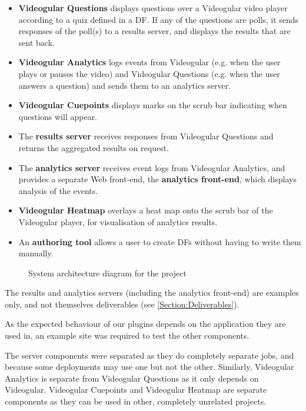 \begin{itemize}
	\item
		\textbf{Videogular Questions} displays questions over a \gls{Videogular} video player according to a quiz defined in a \gls{DF}. If any of the questions are polls, it sends responses of the poll(s) to a results server, and displays the results that are sent back.
	\item
		\textbf{Videogular Analytics} logs events from \gls{Videogular} (e.g. when the user plays or pauses the video) and Videogular Questions (e.g. when the user answers a question) and sends them to an analytics server.
	\item
		\textbf{Videogular Cuepoints} displays marks on the \gls{scrub bar} indicating when questions will appear.
	\item
		The \textbf{results server} receives responses from Videogular Questions and returns the aggregated results on request.
	\item
		The \textbf{analytics server} receives event logs from Videogular Analytics, and provides a separate Web front-end, the \textbf{analytics front-end}, which displays analysis of the events.
	\item
		\textbf{Videogular Heatmap} overlays a heat map onto the \gls{scrub bar} of the \gls{Videogular} player, for visualisation of analytics results.
	\item
		An \textbf{authoring tool} allows a user to create \glspl{DF} without having to write them manually.
\end{itemize}

\begin{figure}[h!]
	\centering
	
	\caption{System architecture diagram for the project \label{fig:System architecture diagram}}
\end{figure}

The results and analytics servers (including the analytics front-end) are examples only, and not themselves deliverables (see \autoref{Section:Deliverables}).

As the expected behaviour of our plugins depends on the application they are used in, an example site was required to test the other components.

The server components were separated as they do completely separate jobs, and because some deployments may use one but not the other. Similarly, Videogular Analytics is separate from Videogular Questions as it only depends on \gls{Videogular}. Videogular Cuepoints and Videogular Heatmap are separate components as they can be used in other, completely unrelated projects.

